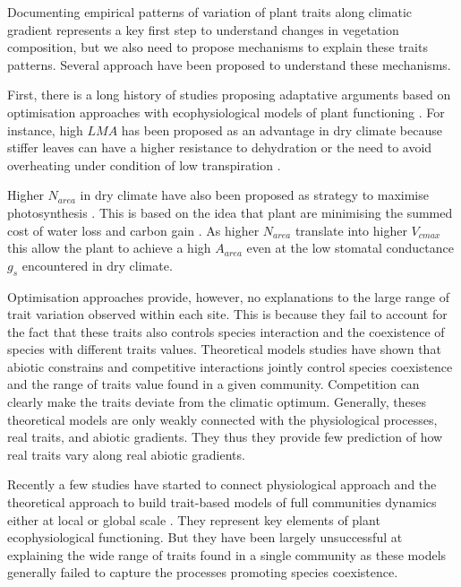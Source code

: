 \documentclass[a4paper,11pt]{article}
\begin{document}
Documenting empirical patterns of variation of plant traits along
climatic gradient represents a key first step to understand changes in
vegetation composition, but we also need to propose mechanisms to
explain these traits patterns. Several approach have been proposed to
understand these mechanisms.


First, there is a long history of studies
proposing adaptative arguments based on optimisation approaches with
ecophysiological models of plant functioning \citep{Makela-2002}. For instance, high $LMA$ has been proposed as an advantage in dry climate because
stiffer leaves can have a higher resistance to dehydration
\citep{Wright-2002a,Wright-2002b} or the need to avoid overheating
under condition of low transpiration \citep{Leigh-2012}.

Higher
$N_{area}$ in dry climate have also been proposed as strategy to
maximise photosynthesis \citep{Wright-2003}. This is
based on the idea that plant are minimising the summed cost of water
loss and carbon gain
\citep{Medlyn-2002,Wright-2003,Prentice-2014,Lu-2016,Wang-2017,Dong-2017}. As
higher $N_{area}$ translate into higher $V_{cmax}$ this allow the
plant to achieve a high $A_{area}$ even at the low stomatal conductance
$g_s$ encountered in dry climate.

Optimisation approaches provide, however, no explanations to the large range of trait variation observed
within each site. This is because they fail to account for the fact that
these traits also controls species interaction and the coexistence of
species with different traits values. 
Theoretical models \citep{Case-2000,Goldberg-2006,Leimar-2008}
studies have shown that abiotic constrains and competitive interactions jointly control species coexistence \citep{Chesson-2018} and the range of traits
value found in a given community. Competition can clearly make the traits deviate from the climatic optimum.  Generally, theses theoretical models are only weakly connected with the physiological processes, real traits, and abiotic gradients. They thus they provide few prediction of how real traits vary along real abiotic gradients. 

Recently a few studies have started to connect physiological approach
and the theoretical approach to build trait-based models of full
communities dynamics either at local \citep{Farrior-2013} or global
scale \citep[see][]{Sakschewski-2015,Scheiter-2013}. They represent key elements of plant ecophysiological functioning. But they have been largely unsuccessful at explaining the wide range of traits found in a single community as these models generally failed to capture the processes promoting species coexistence.
\end{document}
